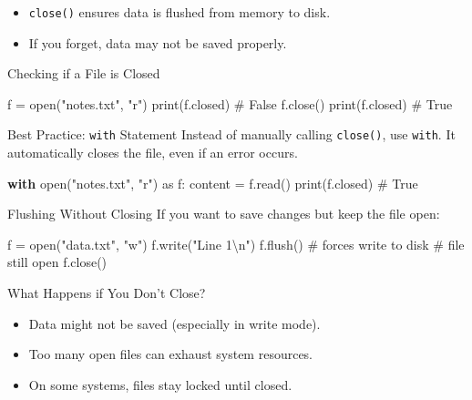 \documentclass[
  letterpaper,
  DIV=11,
  numbers=noendperiod]{scrreprt}
\newenvironment{Shaded}{\begin{snugshade}}{\end{snugshade}}
\newcommand{\BuiltInTok}[1]{\textcolor[rgb]{0.00,0.23,0.31}{#1}}
\newcommand{\CharTok}[1]{\textcolor[rgb]{0.13,0.47,0.30}{#1}}
\newcommand{\CommentTok}[1]{\textcolor[rgb]{0.37,0.37,0.37}{#1}}
\newcommand{\ControlFlowTok}[1]{\textcolor[rgb]{0.00,0.23,0.31}{\textbf{#1}}}
\newcommand{\ImportTok}[1]{\textcolor[rgb]{0.00,0.46,0.62}{#1}}
\newcommand{\NormalTok}[1]{\textcolor[rgb]{0.00,0.23,0.31}{#1}}
\newcommand{\OperatorTok}[1]{\textcolor[rgb]{0.37,0.37,0.37}{#1}}
\newcommand{\StringTok}[1]{\textcolor[rgb]{0.13,0.47,0.30}{#1}}
\providecommand{\tightlist}{%
  \setlength{\itemsep}{0pt}\setlength{\parskip}{0pt}}
\begin{document}
\begin{itemize}
\tightlist
\item
  \texttt{close()} ensures data is flushed from memory to disk.
\item
  If you forget, data may not be saved properly.
\end{itemize}

Checking if a File is Closed

\begin{Shaded}
\begin{Highlighting}[]
\NormalTok{f }\OperatorTok{=} \BuiltInTok{open}\NormalTok{(}\StringTok{"notes.txt"}\NormalTok{, }\StringTok{"r"}\NormalTok{)}
\BuiltInTok{print}\NormalTok{(f.closed)   }\CommentTok{\# False}
\NormalTok{f.close()}
\BuiltInTok{print}\NormalTok{(f.closed)   }\CommentTok{\# True}
\end{Highlighting}
\end{Shaded}

Best Practice: \texttt{with} Statement Instead of manually calling
\texttt{close()}, use \texttt{with}. It automatically closes the file,
even if an error occurs.

\begin{Shaded}
\begin{Highlighting}[]
\ControlFlowTok{with} \BuiltInTok{open}\NormalTok{(}\StringTok{"notes.txt"}\NormalTok{, }\StringTok{"r"}\NormalTok{) }\ImportTok{as}\NormalTok{ f:}
\NormalTok{    content }\OperatorTok{=}\NormalTok{ f.read()}
\BuiltInTok{print}\NormalTok{(f.closed)   }\CommentTok{\# True}
\end{Highlighting}
\end{Shaded}

Flushing Without Closing If you want to save changes but keep the file
open:

\begin{Shaded}
\begin{Highlighting}[]
\NormalTok{f }\OperatorTok{=} \BuiltInTok{open}\NormalTok{(}\StringTok{"data.txt"}\NormalTok{, }\StringTok{"w"}\NormalTok{)}
\NormalTok{f.write(}\StringTok{"Line 1}\CharTok{\textbackslash{}n}\StringTok{"}\NormalTok{)}
\NormalTok{f.flush()     }\CommentTok{\# forces write to disk}
\CommentTok{\# file still open}
\NormalTok{f.close()}
\end{Highlighting}
\end{Shaded}

What Happens if You Don't Close?

\begin{itemize}
\tightlist
\item
  Data might not be saved (especially in write mode).
\item
  Too many open files can exhaust system resources.
\item
  On some systems, files stay locked until closed.
\end{itemize}
\end{document}
